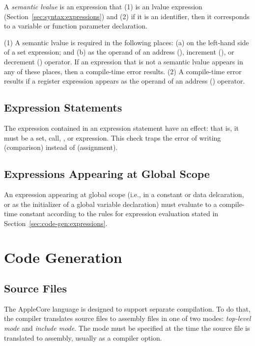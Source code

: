 \documentclass[10pt]{article}
\begin{document}
  A \emph{semantic lvalue} is
an expression that (1) is an lvalue expression
(Section~\ref{sec:syntax:expressions}) and (2) if it is an identifier,
then it corresponds to a variable or function parameter declaration.

  (1) A semantic lvalue is
required in the following places: (a) on the left-hand side of a set
expression; and (b) as the operand of an address (), increment
(), or decrement () operator.  If an expression
that is not a semantic lvalue appears in any of these places, then a
compile-time error results.  (2) A compile-time error results if a
register expression appears as the operand of an address ()
operator.


\subsection{Expression Statements}
\label{sec:semantics:expr-stmts}

The expression contained in an expression statement have an effect:
that is, it must be a set, call, , or  expression.
This check traps the error of writing  (comparison)
instead of  (assignment).

\subsection{Expressions Appearing at Global Scope}

An expression appearing at global scope (i.e., in a constant or data
delcaration, or as the initializer of a global variable declaration)
must evaluate to a compile-time constant according to the rules for
expression evaluation stated in
Section~\ref{sec:code-gen:expressions}.

\section{Code Generation}
\label{sec:code-gen}

\subsection{Source Files}
\label{sec:code-gen:source-files}

The AppleCore language is designed to support separate compilation.
To do that, the compiler translates source files to assembly files in
one of two modes: \emph{top-level mode} and \emph{include mode}.  The
mode must be specified at the time the source file is translated to
assembly, usually as a compiler option.
\end{document}
